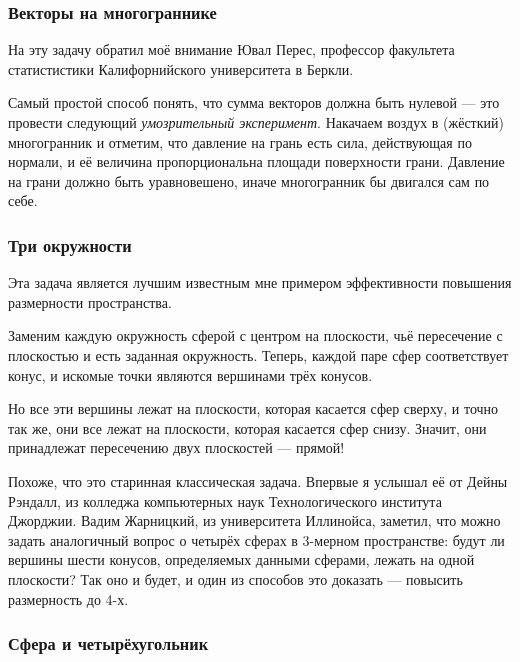 \subsubsection*{Векторы на многограннике}%

На эту задачу обратил моё внимание Ювал Перес, профессор факультета статистистики Калифорнийского университета в Беркли. %

\medskip

Самый простой способ понять, что сумма векторов должна быть нулевой --- это провести следующий \emph{умозрительный эксперимент}.
Накачаем воздух в (жёсткий) многогранник и отметим, что давление на грань есть сила, действующая по нормали, и её величина пропорциональна площади поверхности грани.
Давление на грани должно быть уравновешено, иначе многогранник бы двигался сам по себе.
\heart

\subsubsection*{Три окружности}%

Эта задача является лучшим известным мне примером эффективности повышения размерности пространства.

\medskip

Заменим каждую окружность сферой с центром на плоскости, чьё пересечение с плоскостью и есть заданная окружность.
Теперь, каждой паре сфер соответствует конус, и искомые точки являются вершинами трёх конусов. %

Но все эти вершины лежат на плоскости, которая касается сфер сверху, и точно так
же, они все лежат на плоскости, которая касается сфер снизу.
Значит, они принадлежат пересечению двух плоскостей --- прямой! \heart

Похоже, что это старинная классическая задача.
Впервые я услышал её от Дейны Рэндалл, %
из колледжа компьютерных наук Технологического института Джорджии.
Вадим Жарницкий, из университета Иллинойса, заметил, что можно задать аналогичный вопрос о четырёх сферах в 3-мерном пространстве: будут ли вершины шести конусов, определяемых данными сферами, лежать на одной плоскости?
Так оно и будет, и один из способов это доказать --- повысить размерность до 4-х.

\subsubsection*{Сфера и четырёхугольник}%

